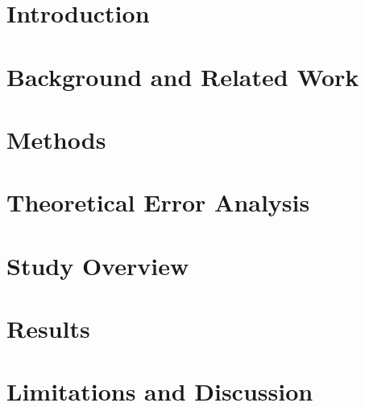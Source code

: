 
\section{Introduction}
\label{sec:introduction}


\vspace{-2mm}
\section{Background and Related Work}
\label{sec:related}


\vspace{-2mm}
\section{Methods}
\label{sec:method}


\vspace{-2mm}
\section{Theoretical Error Analysis}
\label{sec:theory}


\vspace{-2mm}
\section{Study Overview }
\label{sec:study}


\vspace{-2mm}
\section{Results}
\label{sec:results}


%
\vspace{-2mm}
\section{Limitations and Discussion}
\label{sec:limitations}


%

